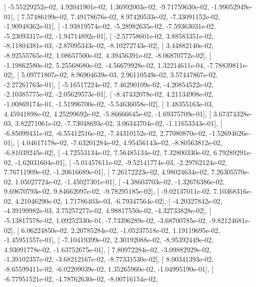 \documentclass{article}
\begin{document}
       [ -5.55229252e-02,   4.92041901e-02,   1.36992003e-02,
         -9.71759630e-02,  -1.99052949e-01],
       [  7.57486199e-02,   7.49178676e-02,   8.97420533e-02,
         -7.33091152e-02,  -1.90948362e-01],
       [ -1.93819574e-02,  -5.28982635e-02,  -7.59363031e-02,
         -5.23093317e-02,  -1.94714892e-01],
       [ -2.57758601e-02,   3.88583351e-02,  -8.11804381e-03,
         -2.87095343e-02,  -8.10272743e-02],
       [  3.44882140e-02,  -8.92555765e-02,   1.08657500e-02,
          4.39456391e-02,  -8.06870772e-02],
       [ -1.19862580e-02,   5.25568680e-02,  -4.56679928e-02,
          1.32214611e-04,  -7.78839811e-02],
       [  5.09771807e-02,   8.96904639e-03,   2.96110549e-02,
          3.57447867e-02,  -2.27261763e-01],
       [ -5.16517224e-02,   7.46290109e-02,  -4.20854522e-02,
         -2.10385775e-02,  -2.05629573e-01],
       [ -8.47432078e-02,   4.21134908e-02,  -1.00869174e-01,
         -1.51996700e-02,  -5.54636058e-02],
       [  1.48355163e-03,   4.45941898e-02,   4.25299692e-02,
         -5.86666645e-02,  -1.69375709e-01],
       [  3.67374328e-03,   3.82271061e-02,  -7.73048693e-02,
          3.06343704e-02,  -1.11653343e-01],
       [ -6.85099431e-02,  -6.55412516e-02,  -7.44310152e-02,
          2.77080870e-02,  -1.52694626e-01],
       [  4.04617178e-02,  -7.63201284e-02,   4.95456143e-02,
         -8.80563812e-02,  -6.81039245e-02],
       [ -4.72553134e-02,   7.56485134e-02,   7.32800330e-02,
          6.79289291e-02,  -1.62031604e-01],
       [ -5.01457611e-02,  -9.52141774e-03,  -2.29762124e-02,
          7.76711909e-02,  -1.20616689e-01],
       [  7.26172223e-02,   4.98024634e-02,   7.26305570e-02,
          1.05027724e-02,  -1.45027301e-01],
       [ -4.38603703e-02,  -1.32676386e-02,   9.69670793e-02,
          9.84662097e-02,  -9.78295185e-02],
       [ -9.02137011e-02,   7.10368316e-02,   4.21046290e-02,
          1.71786403e-03,  -6.79347564e-02],
       [ -4.20327842e-02,  -4.39199982e-03,   3.75257277e-02,
          4.98817550e-02,  -4.32733828e-02],
       [ -5.13817578e-02,   1.09252330e-01,  -7.73396289e-02,
         -3.68700785e-02,  -9.82124681e-02],
       [  6.06224850e-02,   2.20785284e-02,  -1.05237518e-02,
          1.19119695e-02,  -1.45951557e-01],
       [ -7.10419399e-02,   2.30192088e-02,  -8.95392449e-02,
          4.93091778e-02,  -1.63752675e-01],
       [  7.80972284e-02,  -3.09882929e-02,  -1.39102357e-02,
         -3.68212167e-02,  -8.77331530e-02],
       [  8.00341393e-02,  -8.65599411e-02,  -6.02209039e-02,
          1.35265960e-02,  -1.04995190e-01],
       [ -6.77951521e-02,  -4.78762630e-02,  -8.00716154e-02,
\end{document}
